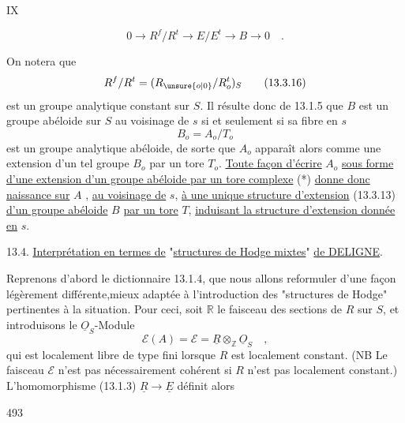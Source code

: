 \hfill IX

\[
0\longrightarrow R^f/R^t\longrightarrow E/E^t\longrightarrow B\longrightarrow 0\quad . \tag*{(13.3.15)}
\]

On notera que
\[
R^f/R^t=(R_{\unsure{o|0}}/R_o^t)_S \tag*{(13.3.16)}
\]
est un groupe analytique constant sur $S$. Il résulte donc de 13.1.5 que $B$ est un groupe abéloide sur $S$ au voisinage de $s$ si et seulement si sa fibre en $s$
\[
B_o=A_o/T_o
\]
est un groupe analytique abéloide, de sorte que $A_o$ apparaît alors comme une extension d'un tel groupe $B_o$ par un tore $T_o$. \uline{Toute façon d'écrire} $A_o$ \uline{sous forme d'une extension d'un groupe abéloide par un tore complexe} (*) \uline{donne donc naissance sur} $A$ , \uline{au voisinage de} $s$, \uline{à une unique structure d'extension} (13.3.13) \uline{d'un groupe abéloide} $B$ \uline{par un tore} $T$, \uline{induisant la structure d'extension donnée en} $s$.

13.4. \uline{Interprétation en termes de} "\uline{structures de Hodge mixtes}" \uline{de DELIGNE}.

Reprenons d'abord le dictionnaire 13.1.4, que nous allons reformuler d'une façon légèrement différente,mieux adaptée à l'introduction des "structures de Hodge" pertinentes à la situation. Pour ceci, soit $\mathbb R$ le faisceau des sections de $R$ sur $S$, et introduisons le $\underline{O}_S$-Module
\[
\mathscr E(A)=\mathscr E=\underline R\otimes_{\mathbb Z}\underline O_S\quad , \tag*{(13.4.1)}
\]
qui est localement libre de type fini lorsque $R$ est localement constant. (NB Le faisceau $\mathscr E$ n'est pas nécessairement cohérent si $R$ n'est pas localement constant.) L'homomorphisme (13.1.3) $\underline R\longrightarrow\underline E$ définit alors

493
